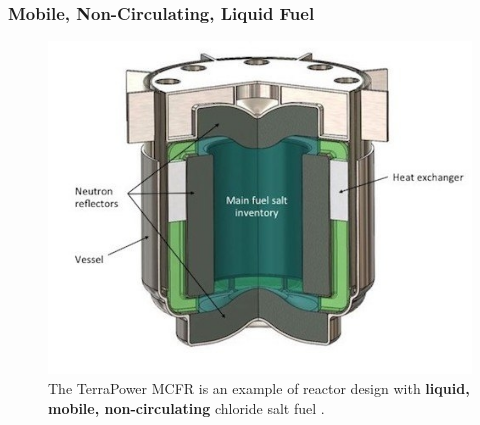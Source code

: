 
\begin{frame}
\frametitle{Mobile, Non-Circulating, Liquid Fuel}
\begin{figure}[t]
\vspace*{-0.1in}
\hspace*{-0.35in}
\includegraphics[height=0.6\textwidth]{./images/mcfr-crossection.jpg}
\caption{The TerraPower MCFR is an example of reactor design with 
\textbf{liquid, mobile, non-circulating} chloride salt fuel 
\cite{doene_southern_2018}.}
\end{figure}   

\end{frame}


